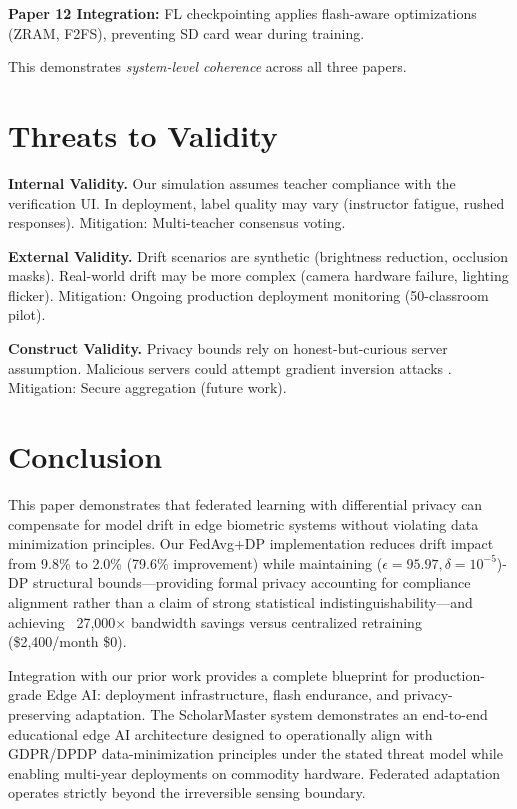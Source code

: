 \documentclass[conference]{IEEEtran}
\begin{document}
\textbf{Paper 12 Integration:} FL checkpointing applies flash-aware optimizations (ZRAM, F2FS), preventing SD card wear during training.

This demonstrates \textit{system-level coherence} across all three papers.

\section{Threats to Validity}

\textbf{Internal Validity.} Our simulation assumes teacher compliance with the verification UI. In deployment, label quality may vary (instructor fatigue, rushed responses). Mitigation: Multi-teacher consensus voting.

\textbf{External Validity.} Drift scenarios are synthetic (brightness reduction, occlusion masks). Real-world drift may be more complex (camera hardware failure, lighting flicker). Mitigation: Ongoing production deployment monitoring (50-classroom pilot).

\textbf{Construct Validity.} Privacy bounds rely on honest-but-curious server assumption. Malicious servers could attempt gradient inversion attacks \cite{b18}. Mitigation: Secure aggregation \cite{b16} (future work).

\section{Conclusion}

This paper demonstrates that federated learning with differential privacy can compensate for model drift in edge biometric systems without violating data minimization principles. Our FedAvg+DP implementation reduces drift impact from 9.8\% to 2.0\% (79.6\% improvement) while maintaining ($\epsilon=95.97, \delta=10^{-5}$)-DP structural bounds—providing formal privacy accounting for compliance alignment rather than a claim of strong statistical indistinguishability—and achieving ~27,000× bandwidth savings versus centralized retraining (\$2,400/month \textrightarrow \$0).

Integration with our prior work \cite{b1, b9} provides a complete blueprint for production-grade Edge AI: deployment infrastructure, flash endurance, and privacy-preserving adaptation. The ScholarMaster system demonstrates an end-to-end educational edge AI architecture designed to operationally align with GDPR/DPDP data-minimization principles under the stated threat model while enabling multi-year deployments on commodity hardware. Federated adaptation operates strictly beyond the irreversible sensing boundary.
\end{document}
